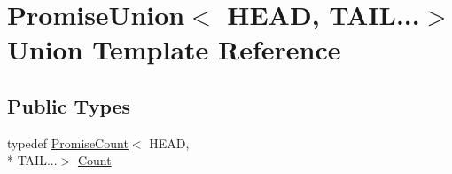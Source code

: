 \hypertarget{unionPromiseUnion_3_01HEAD_00_01TAIL_8_8_8_4}{\section{Promise\-Union$<$ H\-E\-A\-D, T\-A\-I\-L...$>$ Union Template Reference}
\label{unionPromiseUnion_3_01HEAD_00_01TAIL_8_8_8_4}
}
\subsection*{Public Types}
\begin{DoxyCompactItemize}
\item 
typedef \hyperlink{structPromiseCount}{Promise\-Count}$<$ H\-E\-A\-D, \\*
T\-A\-I\-L...$>$ \hyperlink{unionPromiseUnion_3_01HEAD_00_01TAIL_8_8_8_4_a0fc2662670f580f9679389bc21d3c825}{Count}
\end{DoxyCompactItemize}
